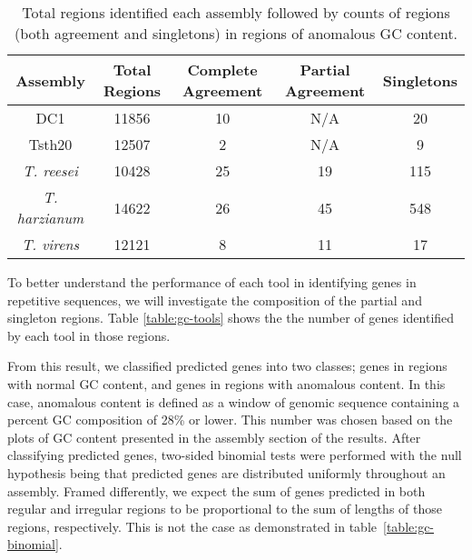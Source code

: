 \begin{table}
  \begin{center}
    \begin{tabular}{|c|c|c|c|c|}
      Assembly & Total Regions & Complete Agreement & Partial Agreement & Singletons \\ \hline
      DC1 & 11856 & 10 & N/A & 20  \\ \hline
      Tsth20 & 12507 & 2 & N/A & 9  \\ \hline
      \textit{T. reesei} & 10428 & 25 & 19 & 115  \\ \hline
      \textit{T. harzianum} & 14622 & 26 & 45 & 548  \\ \hline
      \textit{T. virens} & 12121 & 8 & 11 & 17  \\ \hline
    \end{tabular}
  \end{center}
  \caption[Agreement of predictions in anomalous GC regions.]{Total
    regions identified each assembly followed by counts of regions
    (both agreement and singletons) in regions of anomalous GC
    content.}
  \label{table:gc-regions}
\end{table}

To better understand the performance of each tool in identifying genes
in repetitive sequences, we will investigate the composition of the
partial and singleton regions. Table \ref{table:gc-tools} shows the
the number of genes identified by each tool in those regions.



From this result, we classified predicted genes into two classes;
genes in regions with normal GC content, and genes in regions with
anomalous content. In this case, anomalous content is defined as a
window of genomic sequence containing a percent GC composition of 28\%
or lower. This number was chosen based on the plots of GC content
presented in the assembly section of the results. After classifying
predicted genes, two-sided binomial tests were performed with the null
hypothesis being that predicted genes are distributed uniformly
throughout an assembly. Framed differently, we expect the sum of genes
predicted in both regular and irregular regions to be proportional to
the sum of lengths of those regions, respectively. This is not the
case as demonstrated in table~\ref{table:gc-binomial}.


